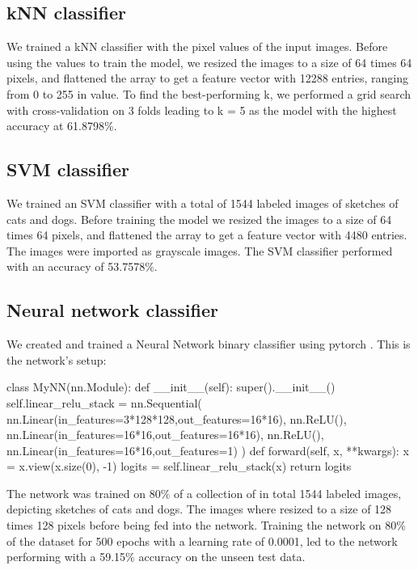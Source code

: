 \subsection*{kNN classifier}
We trained a kNN classifier with the pixel values of the input images. Before
using the values to train the model, we resized the images to a size of 64 times 
64 pixels, and flattened the array to get a feature vector with 12288 entries, 
ranging from 0 to 255 in value. To find the best-performing k, we performed a
grid search with cross-validation on 3 folds leading to k = 5 as the model with 
the highest accuracy at 61.8798\%.

\subsection*{SVM classifier}
We trained an SVM classifier with a total of 1544 labeled images of sketches of
cats and dogs. Before training the model we resized the images to a size of 64
times 64 pixels, and flattened the array to get a feature vector with 4480
entries. The images were imported as grayscale images. The SVM classifier
performed with an accuracy of 53.7578\%.


\subsection*{Neural network classifier}
We created and trained a Neural Network binary classifier using pytorch
\textcite{pytorch}. This is the network's setup:

\begin{python}
    class MyNN(nn.Module):
    def __init__(self):
        super().__init__()
        self.linear_relu_stack = nn.Sequential(
            nn.Linear(in_features=3*128*128,out_features=16*16),
            nn.ReLU(),
            nn.Linear(in_features=16*16,out_features=16*16),
            nn.ReLU(),
            nn.Linear(in_features=16*16,out_features=1)
        )
    def forward(self, x, **kwargs):
        x = x.view(x.size(0), -1)
        logits = self.linear_relu_stack(x)
        return logits
\end{python}

The network was trained on 80\% of a collection of in total 1544 labeled images,
depicting sketches of cats and dogs. The images where resized to a size of
128 times 128 pixels before being fed into the network. Training the network on
80\% of the dataset for 500 epochs with a learning rate of 0.0001, led to the
network performing with a 59.15\% accuracy on the unseen test data.

